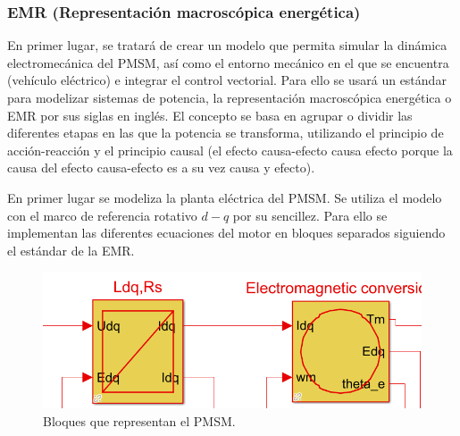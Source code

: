 \subsubsection{EMR (Representación macroscópica energética)}
En primer lugar, se tratará de crear un modelo que permita simular la dinámica electromecánica del PMSM, así como el entorno mecánico en el que se encuentra (vehículo eléctrico) e integrar el control vectorial. Para ello se usará un estándar para modelizar sistemas de potencia, la representación macroscópica energética o EMR por sus siglas en inglés. El concepto se basa en agrupar o dividir las diferentes etapas en las que la potencia se transforma, utilizando el principio de acción-reacción y el principio causal (el efecto causa-efecto causa efecto porque la causa del efecto causa-efecto es a su vez causa y efecto). 

En primer lugar se modeliza la planta eléctrica del PMSM. Se utiliza el modelo con el marco de referencia rotativo $d-q$ por su sencillez. Para ello se implementan las diferentes ecuaciones del motor en bloques separados siguiendo el estándar de la EMR.

\begin{figure}[H]
    \centering
    \includegraphics[width=0.7\linewidth]{fig/motorEMR1.png}
    \caption{Bloques que representan el PMSM.}
\end{figure}

